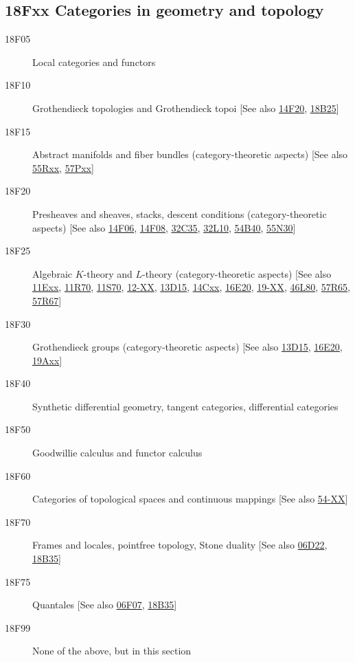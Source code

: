 \documentclass[letterpaper]{article}
\begin{document}
\subsection*{18Fxx  Categories in geometry and topology}\label{18Fxx}
\begin{description}
\item [18F05]\label{18F05} Local categories and functors
\item [18F10]\label{18F10} Grothendieck topologies and Grothendieck topoi [See also \hyperref[14F20]{14F20}, \hyperref[18B25]{18B25}]
\item [18F15]\label{18F15} Abstract manifolds and fiber bundles (category-theoretic aspects) [See also \hyperref[55Rxx]{55Rxx}, \hyperref[57Pxx]{57Pxx}]
\item [18F20]\label{18F20} Presheaves and sheaves, stacks, descent conditions (category-theoretic aspects) [See also \hyperref[14F06]{14F06}, \hyperref[14F08]{14F08}, \hyperref[32C35]{32C35}, \hyperref[32L10]{32L10}, \hyperref[54B40]{54B40}, \hyperref[55N30]{55N30}]
\item [18F25]\label{18F25} Algebraic $K$-theory and $L$-theory (category-theoretic aspects) [See also \hyperref[11Exx]{11Exx}, \hyperref[11R70]{11R70}, \hyperref[11S70]{11S70}, \hyperref[12-XX]{12-XX}, \hyperref[13D15]{13D15}, \hyperref[14Cxx]{14Cxx}, \hyperref[16E20]{16E20}, \hyperref[19-XX]{19-XX}, \hyperref[46L80]{46L80}, \hyperref[57R65]{57R65}, \hyperref[57R67]{57R67}]
\item [18F30]\label{18F30} Grothendieck groups (category-theoretic aspects) [See also \hyperref[13D15]{13D15}, \hyperref[16E20]{16E20}, \hyperref[19Axx]{19Axx}]
\item [18F40]\label{18F40} Synthetic differential geometry, tangent categories, differential categories
\item [18F50]\label{18F50} Goodwillie calculus and functor calculus
\item [18F60]\label{18F60} Categories of topological spaces and continuous mappings [See also \hyperref[54-XX]{54-XX}]
\item [18F70]\label{18F70} Frames and locales, pointfree topology, Stone duality [See also \hyperref[06D22]{06D22}, \hyperref[18B35]{18B35}]
\item [18F75]\label{18F75} Quantales [See also \hyperref[06F07]{06F07}, \hyperref[18B35]{18B35}]
\item [18F99]\label{18F99} None of the above, but in this section
\end{description}
\end{document}
